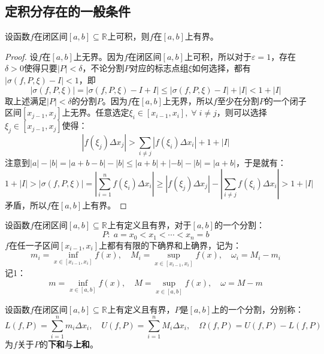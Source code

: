 \subsection{定积分存在的一般条件}
\begin{theorem}\label{theo:RiemannIntegrableBounded}
	设函数$f$在闭区间$[a,b]\subseteq\mathbb{R}^{}$上可积，则$f$在$[a,b]$上有界。
\end{theorem}
\begin{proof}
	设$f$在$[a,b]$上无界。因为$f$在闭区间$[a,b]$上可积，所以对于$\varepsilon=1$，存在$\delta>0$使得只要$|P|<\delta$，不论分割$P$对应的标志点组$\xi$如何选择，都有$|\sigma(f,P,\xi)-I|<1$，即
	\begin{equation*}
		|\sigma(f,P,\xi)|=|\sigma(f,P,\xi)-I+I|\leqslant|\sigma(f,P,\xi)-I|+|I|<1+|I|
	\end{equation*}
	取上述满足$|P|<\delta$的分割$P$。因为$f$在$[a,b]$上无界，所以$f$至少在分割$P$的一个闭子区间$[x_{j-1},x_j]$上无界。任意选定$\xi_i\in[x_{i-1},x_i],\;\forall\;i\ne j$，则可以选择$\xi_j\in[x_{j-1},x_j]$使得：
	\begin{equation*}
		|f(\xi_j)\Delta x_j|>\sum_{i\ne j}|f(\xi_i)\Delta x_i|+1+|I|
	\end{equation*}
	注意到$|a|-|b|=|a+b-b|-|b|\leqslant|a+b|+|-b|-|b|=|a+b|$，于是就有：
	\begin{equation*}
		1+|I|>|\sigma(f,P,\xi)|=\left|\sum_{i=1}^{n}f(\xi_i)\Delta x_i\right|\geqslant|f(\xi_j)\Delta x_j|-\left|\sum_{i\ne j}^{}f(\xi_i)\Delta x_i\right|>1+|I|
	\end{equation*}
	矛盾，所以$f$在$[a,b]$上有界。
\end{proof}
\begin{definition}
	设函数$f$在闭区间$[a,b]\subseteq\mathbb{R}^{}$上有定义且有界，对于$[a,b]$的一个分割：
	\begin{equation*}
		P:\;a=x_0<x_1<\cdots<x_n=b
	\end{equation*}
	$f$在任一子区间$[x_{i-1},x_i]$上都有有限的下确界和上确界，记为：
	\begin{equation*}
		m_i=\inf_{x\in[x_{i-1},x_i]}f(x),\quad M_i=\sup_{x\in[x_{i-1},x_i]}f(x),\quad\omega_i=M_i-m_i
	\end{equation*}
	记1：
	\begin{equation*}
		m=\inf_{x\in[a,b]}f(x),\quad M=\sup_{x\in[a,b]}f(x),\quad\omega=M-m
	\end{equation*}
\end{definition}
\begin{definition}
	设函数$f$在闭区间$[a,b]\subseteq\mathbb{R}^{}$上有定义且有界，$P$是$[a,b]$上的一个分割，分别称：
	\begin{equation*}
		L(f,P)=\sum_{i=1}^{n}m_i\Delta x_i,\quad U(f,P)=\sum_{i=1}^{n}M_i\Delta x_i,\quad\Omega(f,P)=U(f,P)-L(f,P)
	\end{equation*}
	为$f$关于$P$的\textbf{下和}与\textbf{上和}。
\end{definition}
